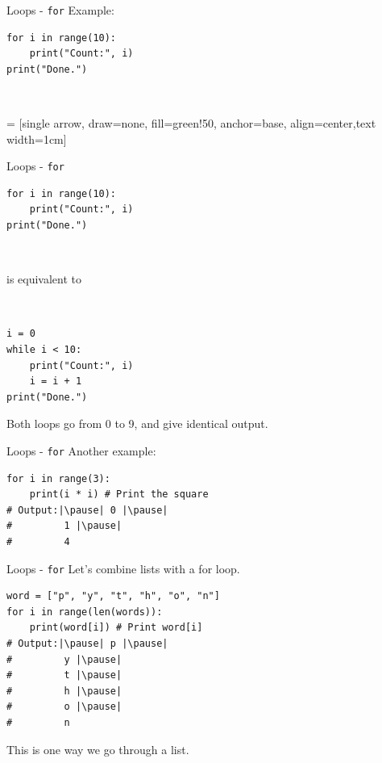 \documentclass[dvipsnames, svgnames, x11names, handout]{beamer}
\begin{document}
\begin{frame}[fragile]{Loops - \texttt{for}}
Example:
\begin{verbatim}
for i in range(10):
    print("Count:", i)
print("Done.")
\end{verbatim}

\ 

 = [single arrow, draw=none, fill=green!50, anchor=base, align=center,text width=1cm]
\end{frame}

\begin{frame}[fragile]{Loops - \texttt{for}}
\begin{verbatim}
for i in range(10):
    print("Count:", i)
print("Done.")
\end{verbatim}

\

is equivalent to

\

\begin{verbatim}
i = 0
while i < 10:
    print("Count:", i)
    i = i + 1
print("Done.")
\end{verbatim}

Both loops go from 0 to 9, and give identical output.
\end{frame}

\begin{frame}[fragile]{Loops - \texttt{for}}
Another example:
\begin{verbatim}
for i in range(3):
    print(i * i) # Print the square
# Output:|\pause| 0 |\pause|
#         1 |\pause|
#         4
\end{verbatim}
\end{frame}

\begin{frame}[fragile]{Loops - \texttt{for}}
Let's combine lists with a for loop.
\begin{verbatim}
word = ["p", "y", "t", "h", "o", "n"]
for i in range(len(words)):
    print(word[i]) # Print word[i]
# Output:|\pause| p |\pause|
#         y |\pause|
#         t |\pause|
#         h |\pause|
#         o |\pause|
#         n
\end{verbatim}
\pause This is one way we go through a list.
\end{frame}
\end{document}
